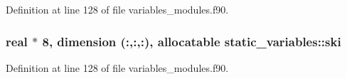 Definition at line 128 of file variables\+\_\+modules.\+f90.

\subsubsection[{\texorpdfstring{ski}{ski}}]{\setlength{\rightskip}{0pt plus 5cm}real $\ast$ 8, dimension (\+:,\+:,\+:), allocatable static\+\_\+variables\+::ski}\hypertarget{namespacestatic__variables_a98bc21063e8e3c88bf50664c36f0b1d0}{}\label{namespacestatic__variables_a98bc21063e8e3c88bf50664c36f0b1d0}


Definition at line 128 of file variables\+\_\+modules.\+f90.

